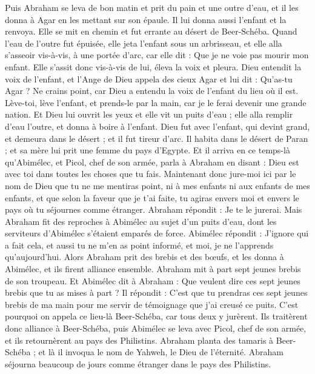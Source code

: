 \begin{multicols}{2}
Puis Abraham se leva de bon matin et prit du pain et une outre d'eau, et il les donna à Agar en les mettant sur son épaule. Il lui donna aussi l'enfant et la renvoya. Elle se mit en chemin et fut errante au désert de Beer-Schéba.
Quand l'eau de l’outre fut épuisée, elle jeta l'enfant sous un arbrisseau,
et elle alla s’asseoir vis-à-vis, à une portée d’arc, car elle dit : Que je ne voie pas mourir mon enfant. Elle s’assit donc vis-à-vis de lui, éleva la voix et pleura.
Dieu entendit la voix de l'enfant, et l'Ange de Dieu appela des cieux Agar et lui dit : Qu'as-tu Agar ? Ne crains point, car Dieu a entendu la voix de l'enfant du lieu où il est.
Lève-toi, lève l'enfant, et prends-le par la main, car je le ferai devenir une grande nation.
Et Dieu lui ouvrit les yeux et elle vit un puits d'eau ; elle alla remplir d'eau l’outre, et donna à boire à l'enfant.
Dieu fut avec l'enfant, qui devint grand, et demeura dans le désert ; et il fut tireur d'arc.
Il habita dans le désert de Paran ; et sa mère lui prit une femme du pays d'Egypte.
Et il arriva en ce temps-là qu'Abimélec, et Picol, chef de son armée, parla à Abraham en disant : Dieu est avec toi dans toutes les choses que tu fais.
Maintenant donc jure-moi ici par le nom de Dieu que tu ne me mentiras point, ni à mes enfants ni aux enfants de mes enfants, et que selon la faveur que je t'ai faite, tu agiras envers moi et envers le pays où tu séjournes comme étranger.
Abraham répondit : Je te le jurerai.
Mais Abraham fit des reproches à Abimélec au sujet d'un puits d'eau, dont les serviteurs d'Abimélec s'étaient emparés de force.
Abimélec répondit : J’ignore qui a fait cela, et aussi tu ne m'en as point informé, et moi, je ne l’apprends qu’aujourd’hui.
Alors Abraham prit des brebis et des bœufs, et les donna à Abimélec, et ils firent alliance ensemble.
Abraham mit à part sept jeunes brebis de son troupeau.
Et Abimélec dit à Abraham : Que veulent dire ces sept jeunes brebis que tu as mises à part ?
Il répondit : C'est que tu prendras ces sept jeunes brebis de ma main pour me servir de témoignage que j'ai creusé ce puits.
C'est pourquoi on appela ce lieu-là Beer-Schéba, car tous deux y jurèrent.
Ils traitèrent donc alliance à Beer-Schéba, puis Abimélec se leva avec Picol, chef de son armée, et ils retournèrent au pays des Philistins.
Abraham planta des tamaris à Beer-Schéba ; et là il invoqua le nom de Yahweh, le Dieu de l’éternité.
Abraham séjourna beaucoup de jours comme étranger dans le pays des Philistins.

\end{multicols}
